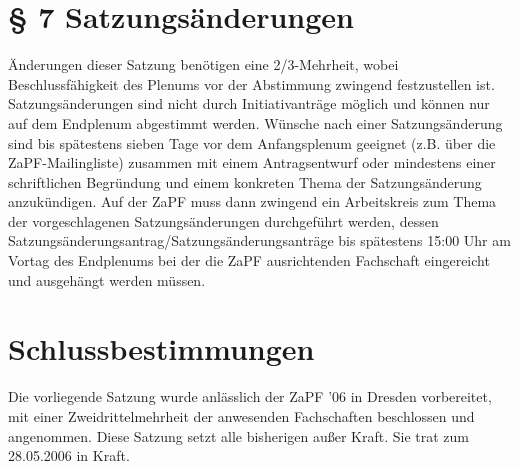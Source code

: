 \section*{§ 7 Satzungsänderungen}
Änderungen dieser Satzung benötigen eine 2/3-Mehrheit, wobei Beschlussfähigkeit
des Plenums vor der Abstimmung zwingend festzustellen ist. Satzungsänderungen
sind nicht durch Initiativanträge möglich und können nur auf dem Endplenum
abgestimmt werden. Wünsche nach einer Satzungsänderung sind bis spätestens
sieben Tage vor dem Anfangsplenum geeignet (z.B. über die ZaPF-Mailingliste)
zusammen mit einem Antragsentwurf oder mindestens einer schriftlichen
Begründung und einem konkreten Thema der Satzungsänderung anzukündigen. Auf der
ZaPF muss dann zwingend ein Arbeitskreis zum Thema der vorgeschlagenen
Satzungsänderungen durchgeführt werden, dessen
Satzungsänderungsantrag/Satzungsänderungsanträge bis spätestens 15:00 Uhr am
Vortag des Endplenums bei der die ZaPF ausrichtenden Fachschaft eingereicht und
ausgehängt werden müssen.

\section*{Schlussbestimmungen}
Die vorliegende Satzung wurde anlässlich der ZaPF '06 in Dresden vorbereitet,
mit einer Zweidrittelmehrheit der anwesenden Fachschaften beschlossen und
angenommen. Diese Satzung setzt alle bisherigen außer Kraft. Sie trat zum
28.05.2006 in Kraft.



